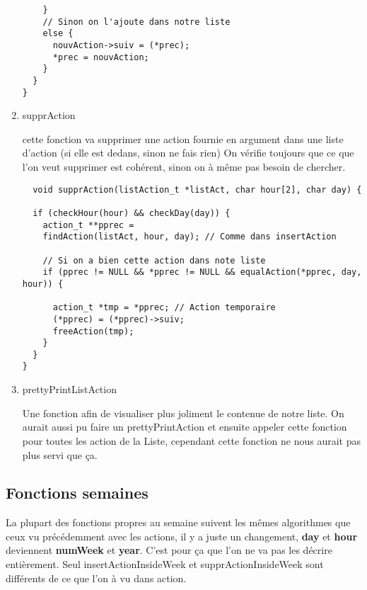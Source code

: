 \documentclass[11pt]{article}
\begin{document}
\begin{enumerate}
\begin{lstlisting}
    }
    // Sinon on l'ajoute dans notre liste
    else {
      nouvAction->suiv = (*prec);
      *prec = nouvAction;
    }
  }
}
\end{lstlisting}


\item supprAction
\label{sec:orga6556b9}

cette fonction va supprimer une action fournie en argument dans une liste
d'action
(si elle est dedans, sinon ne fais rien)
On vérifie toujours que ce que l'on veut supprimer est cohérent, sinon on à
même pas besoin de chercher.

\begin{lstlisting}
  void supprAction(listAction_t *listAct, char hour[2], char day) {

  if (checkHour(hour) && checkDay(day)) {
    action_t **pprec =
	findAction(listAct, hour, day); // Comme dans insertAction

    // Si on a bien cette action dans note liste
    if (pprec != NULL && *pprec != NULL && equalAction(*pprec, day, hour)) {

      action_t *tmp = *pprec; // Action temporaire
      (*pprec) = (*pprec)->suiv;
      freeAction(tmp);
    }
  }
}
\end{lstlisting}


\item prettyPrintListAction
\label{sec:org5e220c9}

Une fonction afin de visualiser plus joliment le contenue de notre
liste.
On aurait aussi pu faire un prettyPrintAction et ensuite appeler cette
fonction pour toutes les action de la Liste, cependant cette fonction ne
nous aurait pas plus servi que ça.
\end{enumerate}


\subsection{Fonctions semaines}
\label{sec:org036e17d}

La plupart des fonctions propres au semaine suivent les mêmes algorithmes que
ceux vu précédemment avec les actions, il y a juste un changement, \textbf{day}
et \textbf{hour} deviennent \textbf{numWeek} et \textbf{year}. C'est pour ça que l'on ne va pas
les décrire entièrement. Seul insertActionInsideWeek et supprActionInsideWeek
sont différents de ce que l'on à vu dans action.
\end{document}
